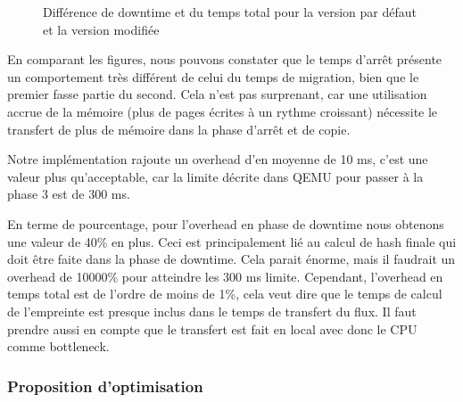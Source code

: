\begin{description}
\begin{figure}[H]
\begin{minipage}{0.48\textwidth}
\end{minipage}
\caption{Différence de downtime et du temps total pour la version par défaut et la version modifiée}
\end{figure}


\end{description}

En comparant les figures, nous pouvons constater que le temps d'arrêt présente un comportement très différent de celui du temps de migration, bien que le premier fasse partie du second.
Cela n'est pas surprenant, car une utilisation accrue de la mémoire (plus de pages écrites à un rythme croissant) nécessite le transfert de plus de mémoire dans la phase d'arrêt et de copie.

Notre implémentation rajoute un overhead d'en moyenne de 10 ms, c'est une valeur plus qu'acceptable, car la limite décrite dans QEMU pour passer à la phase 3 est de 300 ms.

En terme de pourcentage, pour l'overhead en phase de downtime nous obtenons une valeur de 40\% en plus.
Ceci est principalement lié au calcul de hash finale qui doit être faite dans la phase de downtime.
Cela parait énorme, mais il faudrait un overhead de 10000\% pour atteindre les 300 ms limite.
Cependant, l'overhead en temps total est de l'ordre de moins de 1\%, cela veut dire que le temps de calcul de l'empreinte est presque inclus dans le temps de transfert du flux.
Il faut prendre aussi en compte que le transfert est fait en local avec donc le CPU comme bottleneck.
\subsubsection{Proposition d'optimisation}

